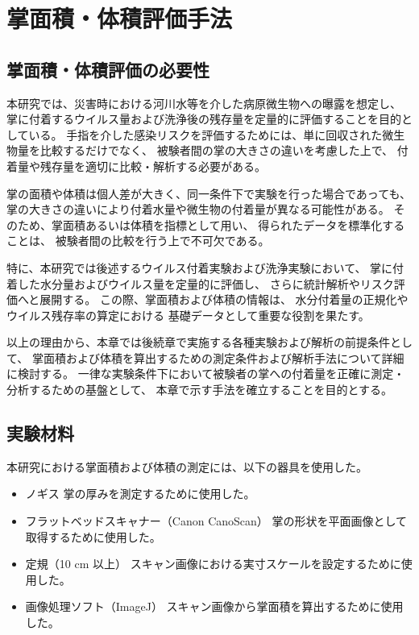 \chapter{掌面積・体積評価手法}

\section{掌面積・体積評価の必要性}

本研究では、災害時における河川水等を介した病原微生物への曝露を想定し、
掌に付着するウイルス量および洗浄後の残存量を定量的に評価することを目的としている。
手指を介した感染リスクを評価するためには、単に回収された微生物量を比較するだけでなく、
被験者間の掌の大きさの違いを考慮した上で、
付着量や残存量を適切に比較・解析する必要がある。

掌の面積や体積は個人差が大きく、同一条件下で実験を行った場合であっても、
掌の大きさの違いにより付着水量や微生物の付着量が異なる可能性がある。
そのため、掌面積あるいは体積を指標として用い、
得られたデータを標準化することは、
被験者間の比較を行う上で不可欠である。

特に、本研究では後述するウイルス付着実験および洗浄実験において、
掌に付着した水分量およびウイルス量を定量的に評価し、
さらに統計解析やリスク評価へと展開する。
この際、掌面積および体積の情報は、
水分付着量の正規化やウイルス残存率の算定における
基礎データとして重要な役割を果たす。

以上の理由から、本章では後続章で実施する各種実験および解析の前提条件として、
掌面積および体積を算出するための測定条件および解析手法について詳細に検討する。
一律な実験条件下において被験者の掌への付着量を正確に測定・分析するための基盤として、
本章で示す手法を確立することを目的とする。


\section{実験材料}

本研究における掌面積および体積の測定には、以下の器具を使用した。

\begin{itemize}
  \item ノギス  
  掌の厚みを測定するために使用した。
  \item フラットベッドスキャナー（Canon CanoScan）  
  掌の形状を平面画像として取得するために使用した。
  \item 定規（10 cm 以上）  
  スキャン画像における実寸スケールを設定するために使用した。
  \item 画像処理ソフト（ImageJ）  
  スキャン画像から掌面積を算出するために使用した。
\end{itemize}

